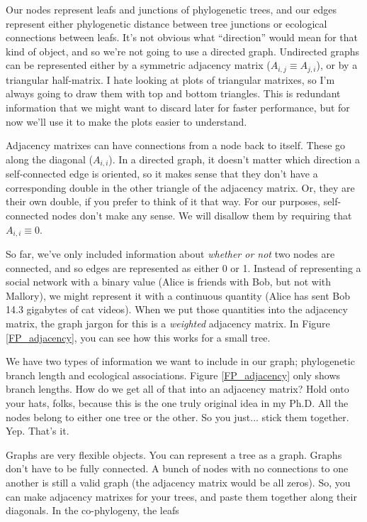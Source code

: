 \documentclass[
10pt, %
a4paper, %
oneside, %
headinclude,footinclude, %
BCOR5mm, %
]{scrartcl}
\begin{document}


Our nodes represent leafs and junctions of phylogenetic trees, and our edges represent either phylogenetic distance between tree junctions or ecological connections between leafs. It's not obvious what ``direction'' would mean for that kind of object, and so we're not going to use a directed graph. Undirected graphs can be represented either by a symmetric adjacency matrix ($A_{i,j} \equiv A_{j,i}$), or by a triangular half-matrix. I hate looking at plots of triangular matrixes, so I'm always going to draw them with top and bottom triangles. This is redundant information that we might want to discard later for faster performance, but for now we'll use it to make the plots easier to understand.

Adjacency matrixes can have connections from a node back to itself. These go along the diagonal ($A_{i,i}$). In a directed graph, it doesn't matter which direction a self-connected edge is oriented, so it makes sense that they don't have a corresponding double in the other triangle of the adjacency matrix. Or, they are their own double, if you prefer to think of it that way. For our purposes, self-connected nodes don't make any sense. We will disallow them by requiring that $A_{i,i} \equiv 0$.

So far, we've only included information about {\em whether or not} two nodes are connected, and so edges are represented as either 0 or 1. Instead of representing a social network with a binary value (Alice is friends with Bob, but not with Mallory), we might represent it with a continuous quantity (Alice has sent Bob 14.3 gigabytes of cat videos). When we put those quantities into the adjacency matrix, the graph jargon for this is a {\em weighted} adjacency matrix. In Figure \ref{FP_adjacency}, you can see how this works for a small tree. 

We have two types of information we want to include in our graph; phylogenetic branch length and ecological associations. Figure \ref{FP_adjacency} only shows branch lengths. How do we get all of that into an adjacency matrix? Hold onto your hats, folks, because this is the one truly original idea in my Ph.D. All the nodes belong to either one tree or the other. So you just... stick them together. Yep. That's it. 

Graphs are very flexible objects. You can represent a tree as a graph. Graphs don't have to be fully connected. A bunch of nodes with no connections to one another is still a valid graph (the adjacency matrix would be all zeros). So, you can make adjacency matrixes for your trees, and paste them together along their diagonals. In the co-phylogeny, the leafs
\end{document}
